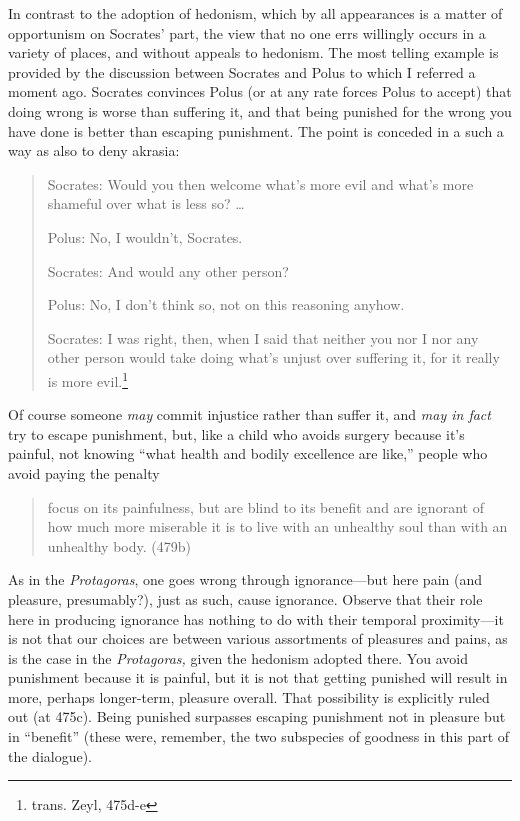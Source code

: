\documentclass[11pt]{amsart}
\begin{document}
In contrast to the adoption of hedonism, which by all appearances is a matter of opportunism on Socrates' part, the view that no one errs willingly occurs in a variety of places, and without appeals to hedonism. The most telling example is provided by the discussion between Socrates and Polus to which I referred a moment ago. Socrates convinces Polus (or at any rate forces Polus to accept) that doing wrong is worse than suffering it, and that being punished for the wrong you have done is better than escaping punishment. The point is conceded in a such a way as also to deny akrasia:\begin{quote}Socrates: Would you then welcome what's more evil and what's more shameful over what is less so? \ldots

\noindent Polus: No, I wouldn't, Socrates.

\noindent Socrates: And would any other person?

\noindent Polus: No, I don't think so, not on this reasoning anyhow.

\noindent Socrates: I was right, then, when I said that neither you nor I nor any other person would take doing what's unjust over suffering it, for it really is more evil.\footnote{trans. Zeyl, 475d-e}\end{quote} Of course someone \emph{may} commit injustice rather than suffer it, and \emph{may in fact} try to escape punishment, but, like a child who avoids surgery because it's painful, not knowing ``what health and bodily excellence are like,'' people who avoid paying the penalty \begin{quote}focus on its painfulness, but are blind to its benefit and are ignorant of how much more miserable it is to live with an unhealthy soul than with an unhealthy body. (479b)\end{quote} As in the \emph{Protagoras}, one goes wrong through ignorance---but here pain (and pleasure, presumably?), just as such, cause ignorance. Observe that their role here in producing ignorance has nothing to do with their temporal proximity---it is not that our choices are between various assortments of pleasures and pains, as is the case in the \emph{Protagoras,} given the hedonism adopted there. You avoid punishment because it is painful, but it is not that getting punished will result in more, perhaps longer-term, pleasure overall. That possibility is explicitly ruled out (at 475c). Being punished surpasses escaping punishment not in pleasure but in ``benefit'' (these were, remember, the two subspecies of goodness in this part of the dialogue).
\end{document}
